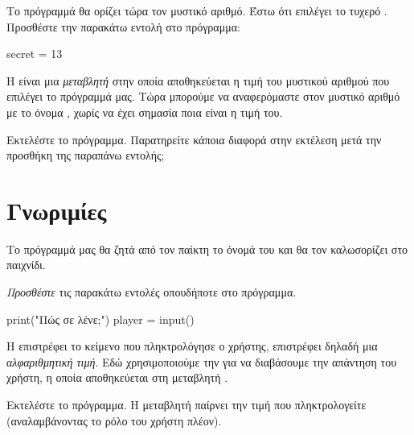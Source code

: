 \documentclass[a4paper,11pt,oneside]{book}
\begin{document}
\begin{step}
\label{step:secret-assign}
Το πρόγραμμά θα ορίζει τώρα τον μυστικό αριθμό. Έστω ότι επιλέγει το τυχερό . Προσθέστε την παρακάτω εντολή στο πρόγραμμα:

\begin{pynew}
secret = 13
\end{pynew}

Η  είναι μια \emph{μεταβλητή} στην οποία αποθηκεύεται η τιμή του μυστικού αριθμού που επιλέγει το πρόγραμμά μας. 
Τώρα μπορούμε να αναφερόμαστε στον μυστικό αριθμό με το όνομα , χωρίς να έχει σημασία ποια είναι η τιμή του.

Εκτελέστε το πρόγραμμα. Παρατηρείτε κάποια διαφορά στην εκτέλεση μετά την προσθήκη της παραπάνω εντολής;

\marginnote[14pt]{\icondiscuss}
\dottedline

\end{step}

\section{Γνωριμίες}

Το πρόγραμμά μας θα ζητά από τον παίκτη το όνομά του και θα τον καλωσορίζει στο παιχνίδι.

\begin{step}
\label{step:name-input}
\emph{Προσθέστε} τις παρακάτω εντολές οπουδήποτε στο πρόγραμμα.

\begin{pynew}
print("Πώς σε λένε;")
player = input()
\end{pynew}

Η  επιστρέφει το κείμενο που πληκτρολόγησε ο χρήστης, επιστρέφει δηλαδή μια \emph{αλφαριθμητική τιμή}. Εδώ χρησιμοποιούμε την  για να διαβάσουμε την απάντηση του χρήστη, η οποία αποθηκεύεται στη μεταβλητή .

Εκτελέστε το πρόγραμμα. Η μεταβλητή  παίρνει την τιμή που πληκτρολογείτε (αναλαμβάνοντας το ρόλο του χρήστη πλέον).
\end{step}
\end{document}
